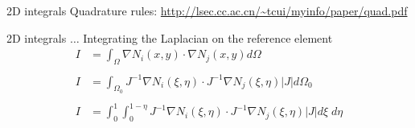 \documentclass[handout]{beamer}
{
\usepackage{fullpage}
\usepackage{hyperref}
\usepackage{amssymb} 
}
\begin{document}
\begin{frame}{2D integrals}
  \centering
Quadrature rules:
\url{http://lsec.cc.ac.cn/~tcui/myinfo/paper/quad.pdf}

\end{frame}

\begin{frame}{2D integrals $\ldots$}
Integrating the Laplacian on the reference element
\begin{align*}
I &= \int_{\Omega} \nabla N_i(x,y) \cdot \nabla N_j(x,y) d \Omega \\ \\
I &= \int_{\Omega_0} J^{-1} \nabla N_i (\xi, \eta) \cdot J^{-1}\nabla N_j (\xi, \eta) |J| d \Omega_0 \\ \\
I &= \int_{0}^1 \int_{0}^{1-\eta} J^{-1} \nabla N_i(\xi, \eta) \cdot J^{-1}\nabla N_j(\xi, \eta) |J| d \xi \; d \eta \\ \\
\end{align*}

\end{frame}
\end{document}
